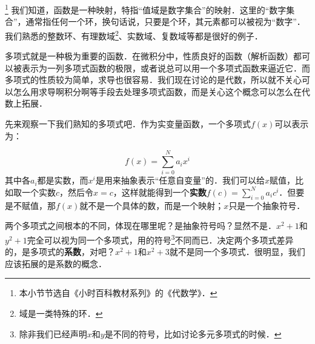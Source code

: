 

\footnote{本小节节选自《小时百科教材系列》的《代数学》．}
我们知道，函数是一种映射，特指“值域是数字集合”的映射．这里的“数字集合”，通常指任何一个环，换句话说，只要是个环，其元素都可以被视为“数字”．我们熟悉的整数环、有理数域\footnote{域是一类特殊的环．}、实数域、复数域等都是很好的例子．

多项式就是一种极为重要的函数．在微积分中，性质良好的函数（解析函数）都可以被表示为一列多项式函数的极限，或者说总可以用一个多项式函数来逼近它．而多项式的性质较为简单，求导也很容易．我们现在讨论的是代数，所以就不关心可以怎么用求导啊积分啊等手段去处理多项式函数，而是关心这个概念可以怎么在代数上拓展．

先来观察一下我们熟知的多项式吧．作为实变量函数，一个多项式$f(x)$可以表示为：

\begin{equation}
    f(x) = \sum_{i=0}^N a_i x^i
\end{equation}
其中各$a_i$都是实数，而$x^i$是用来抽象表示“任意自变量”的．我们可以给$x$赋值，比如取一个实数$c$，然后令$x=c$，这样就能得到一个\textbf{实数}$f(c)=\sum_{i=0}^N a_i c^i$．但要是不赋值，那$f(x)$就不是一个具体的数，而是一个映射；$x$只是一个抽象符号．

两个多项式之间根本的不同，体现在哪里呢？是抽象符号吗？显然不是．$x^2+1$和$y^2+1$完全可以视为同一个多项式，用的符号\footnote{除非我们已经声明$x$和$y$是不同的符号，比如讨论多元多项式的时候．}不同而已．决定两个多项式差异的，是多项式的\textbf{系数}，对吧？$x^2+1$和$x^2+3$就不是同一个多项式．很明显，我们应该拓展的是系数的概念．





